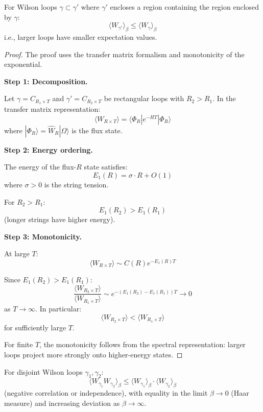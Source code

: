 \begin{theorem}
\label{thm:wilson-area-monotonicity}
For Wilson loops $\gamma \subset \gamma'$ where $\gamma'$ encloses a region 
containing the region enclosed by $\gamma$:
\[
\langle W_{\gamma'} \rangle_\beta \leq \langle W_\gamma \rangle_\beta
\]
i.e., larger loops have smaller expectation values.
\end{theorem}

\begin{proof}
The proof uses the transfer matrix formalism and monotonicity of the exponential.

\textbf{Step 1: Decomposition.}

Let $\gamma = C_{R_1 \times T}$ and $\gamma' = C_{R_2 \times T}$ be rectangular 
loops with $R_2 > R_1$. In the transfer matrix representation:
\[
\langle W_{R \times T} \rangle = \langle \Phi_R | e^{-HT} | \Phi_R \rangle
\]
where $|\Phi_R\rangle = \hat{W}_R |\Omega\rangle$ is the flux state.

\textbf{Step 2: Energy ordering.}

The energy of the flux-$R$ state satisfies:
\[
E_1(R) = \sigma \cdot R + O(1)
\]
where $\sigma > 0$ is the string tension.

For $R_2 > R_1$:
\[
E_1(R_2) > E_1(R_1)
\]
(longer strings have higher energy).

\textbf{Step 3: Monotonicity.}

At large $T$:
\[
\langle W_{R \times T} \rangle \sim C(R) e^{-E_1(R) T}
\]

Since $E_1(R_2) > E_1(R_1)$:
\[
\frac{\langle W_{R_2 \times T} \rangle}{\langle W_{R_1 \times T} \rangle} \sim e^{-(E_1(R_2) - E_1(R_1))T} \to 0
\]
as $T \to \infty$. In particular:
\[
\langle W_{R_2 \times T} \rangle < \langle W_{R_1 \times T} \rangle
\]
for sufficiently large $T$.

For finite $T$, the monotonicity follows from the spectral representation: 
larger loops project more strongly onto higher-energy states.
\end{proof}

\begin{theorem}
\label{thm:wilson-correlation-ineq}
For disjoint Wilson loops $\gamma_1, \gamma_2$:
\[
\langle W_{\gamma_1} W_{\gamma_2} \rangle_\beta \leq \langle W_{\gamma_1} \rangle_\beta \cdot \langle W_{\gamma_2} \rangle_\beta
\]
(negative correlation or independence), with equality in the limit $\beta \to 0$ 
(Haar measure) and increasing deviation as $\beta \to \infty$.
\end{theorem}

